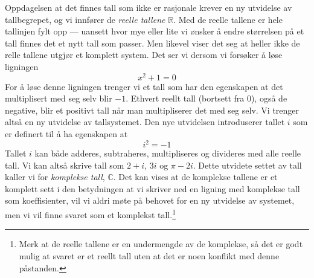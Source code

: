 \documentclass[a4paper,norsk,12pt]{article}
\begin{document}
Oppdagelsen at det finnes tall som ikke er rasjonale krever en ny utvidelse av tallbegrepet, og vi innfører de \emph{reelle tallene} $\mathbb{R}$. Med de reelle tallene er hele tallinjen fylt opp --- uansett hvor mye eller lite vi ønsker å endre størrelsen på et tall finnes det et nytt tall som passer. Men likevel viser det seg at heller ikke de relle tallene utgjør et komplett system. Det ser vi dersom vi forsøker å løse ligningen
\begin{displaymath}
	x^2+1 = 0
\end{displaymath}
For å løse denne ligningen trenger vi et tall som har den egenskapen at det multiplisert med seg selv blir $-1$. Ethvert reellt tall (bortsett fra 0), også de negative, blir et positivt tall når man multipliserer det med seg selv. Vi trenger altså en ny utvidelse av tallsystemet. Den nye utvidelsen introduserer tallet $i$ som er definert til å ha egenskapen at 
\begin{displaymath}
	i^2 = -1
\end{displaymath}
Tallet $i$ kan både adderes, subtraheres, multipliseres og divideres med alle reelle tall. Vi kan altså skrive tall som $2+i$, $3i$ og $\pi-2i$. Dette utvidete settet av tall kaller vi for \emph{komplekse tall}, $\mathbb{C}$. Det kan vises at de komplekse tallene er et komplett sett i den betydningen at vi skriver ned en ligning med komplekse tall som koeffisienter, vil vi aldri møte på behovet for en ny utvidelse av systemet, men vi vil finne svaret som et komplekst tall.\footnote{Merk at de reelle tallene er en undermengde av de komplekse, så det er godt mulig at svaret er et reellt tall uten at det er noen konflikt med denne påstanden.}
\end{document}
